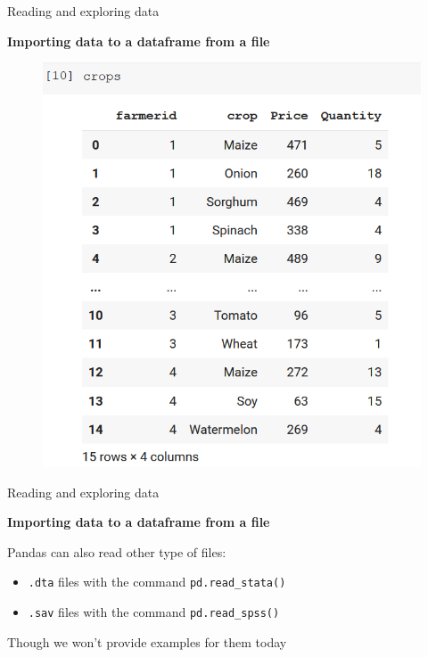 \documentclass[aspectratio=169]{beamer}
\begin{document}
\begin{frame}{Reading and exploring data}

	\textbf{Importing data to a dataframe from a file}

	\begin{figure}
		\centering
		\includegraphics[width=0.4\linewidth]{img/crops_df.png}
	\end{figure}

\end{frame}

\begin{frame}{Reading and exploring data}

	\textbf{Importing data to a dataframe from a file}

	Pandas can also read other type of files:

	\begin{itemize}
		\item \texttt{.dta} files with the command \texttt{pd.read\_stata()}
		\item \texttt{.sav} files with the command \texttt{pd.read\_spss()}
	\end{itemize}

	Though we won't provide examples for them today

\end{frame}
\end{document}

